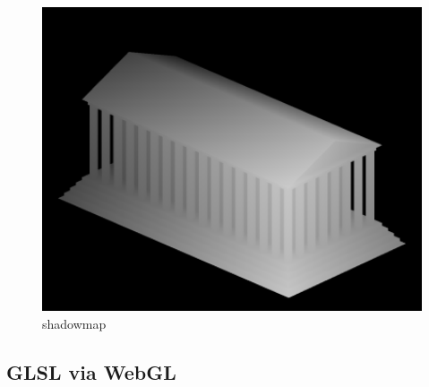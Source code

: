 \begin{figure}[H]
    \centering
    \includegraphics[width=1.0\textwidth]{images/sm_zb.png}
    \caption{shadowmap} %
    \label{fig:shadowmap3}
\end{figure}


\subsection{GLSL via WebGL}
